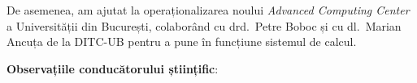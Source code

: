 De asemenea, am ajutat la operaționalizarea noului \emph{Advanced Computing Center} a Universității din București, colaborând cu drd.\ Petre Boboc și cu dl.\ Marian Ancuța de la DITC-UB pentru a pune în funcțiune sistemul de calcul.

\textbf{Observațiile conducătorului științific}:

\vspace{3em}

